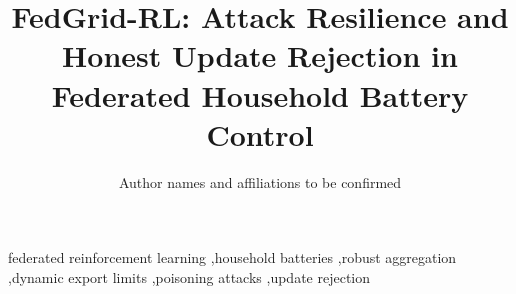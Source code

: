 \documentclass[preprint,12pt,a4paper]{elsarticle}
\begin{document}
\begin{frontmatter}
\title{FedGrid-RL: Attack Resilience and Honest Update Rejection in Federated Household Battery Control}
\author{Author names and affiliations to be confirmed}
\begin{abstract}

\end{abstract}
\begin{keyword}
federated reinforcement learning \sep household batteries \sep robust aggregation \sep dynamic export limits \sep poisoning attacks \sep update rejection
\end{keyword}
\end{frontmatter}










\clearpage

\clearpage

\end{document}
